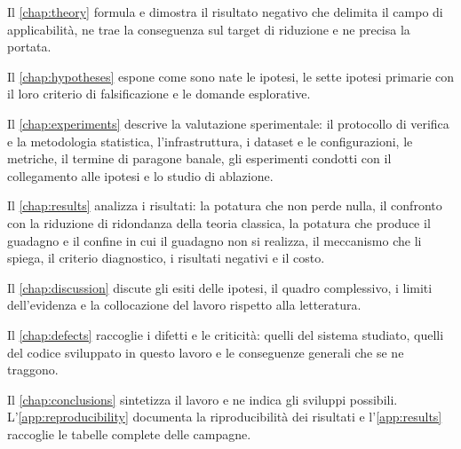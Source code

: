 Il \autoref{chap:theory} formula e dimostra il risultato negativo che delimita il campo di
applicabilità, ne trae la conseguenza sul target di riduzione e ne precisa la portata.

Il \autoref{chap:hypotheses} espone come sono nate le ipotesi, le sette ipotesi primarie con il
loro criterio di falsificazione e le domande esplorative.

Il \autoref{chap:experiments} descrive la valutazione sperimentale: il protocollo di verifica e
la metodologia statistica, l'infrastruttura, i dataset e le configurazioni, le metriche, il
termine di paragone banale, gli esperimenti condotti con il collegamento alle ipotesi e lo studio
di ablazione.

Il \autoref{chap:results} analizza i risultati: la potatura che non perde nulla, il confronto
con la riduzione di ridondanza della teoria classica, la potatura che produce il guadagno e il
confine in cui il guadagno non si realizza, il meccanismo che li spiega, il criterio diagnostico,
i risultati negativi e il costo.

Il \autoref{chap:discussion} discute gli esiti delle ipotesi, il quadro complessivo, i limiti
dell'evidenza e la collocazione del lavoro rispetto alla letteratura.

Il \autoref{chap:defects} raccoglie i difetti e le criticità: quelli del sistema studiato, quelli
del codice sviluppato in questo lavoro e le conseguenze generali che se ne traggono.

Il \autoref{chap:conclusions} sintetizza il lavoro e ne indica gli sviluppi possibili. L'\autoref{app:reproducibility} documenta la riproducibilità dei risultati e
l'\autoref{app:results} raccoglie le tabelle complete delle campagne.
